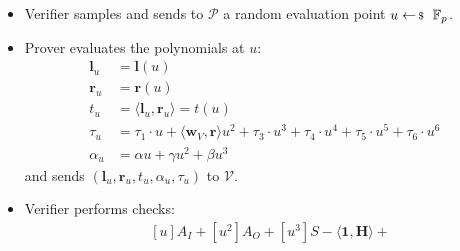 \documentclass[../../book.tex]{subfiles}
\begin{document}
\begin{definition}
\begin{itemize}
        \begin{equation*}
            \begin{aligned}
                T_1 &= [t_1]G + [\tau_1]B\\
                T_3 &= [t_3]G + [\tau_3]B\\
                T_4 &= [t_4]G + [\tau_4]B\\
                T_5 &= [t_5]G + [\tau_5]B\\
                T_6 &= [t_6]G + [\tau_6]B
            \end{aligned}
        \end{equation*}
        \textbf{Note:} The prover does not send a separate commitment to $t_2$, as the verifier could derive it from $\mathbf{V}$ and the circuit public parameters:
        \begin{align*}
            t_2 &= w_c + \langle \mathbf{w}_V, \mathbf{v} \rangle + \delta(y, z) \\
            T_2 &= \langle \mathbf{w}_V, \mathbf{V} \rangle + [\delta(y, z) + w_c]G
        \end{align*}
        \item Verifier samples and sends to $\mathcal{P}$ a random evaluation point $u \leftarrowS \mathbb{F}_p$.
        \item Prover evaluates the polynomials at $u$:
            \begin{equation*}
                \begin{aligned}
                    \mathbf{l}_u &= \mathbf{l}(u) \\
                    \mathbf{r}_u &= \mathbf{r}(u) \\
                    t_u &= \langle \mathbf{l}_u, \mathbf{r}_u \rangle = t(u) \\
                    \tau_u &= \tau_1 \cdot u + \langle \mathbf{w}_V, \mathbf{r} \rangle u^2 + \tau_3 \cdot u^3 + \tau_4 \cdot u^4 + \tau_5 \cdot u^5 + \tau_6 \cdot u^6\\
                    \alpha_u &= \alpha u + \gamma u^2 + \beta u^3
                \end{aligned}
            \end{equation*}
            and sends $(\mathbf{l}_u, \mathbf{r}_u, t_u, \alpha_u, \tau_u)$ to $\mathcal{V}$.
        \item Verifier performs checks:
            \begin{equation*}
                \begin{aligned}
                    &[u]A_I + [u^2]A_O + [u^3]S - \langle \mathbf{1}, \mathbf{H} \rangle + \\

\end{aligned}
\end{equation*}
\end{itemize}
\end{definition}
\end{document}
